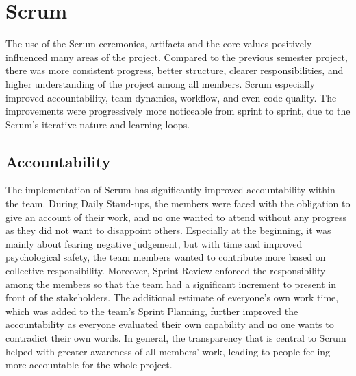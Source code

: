 \section{Scrum}

The use of the Scrum ceremonies, artifacts and the core values positively influenced many areas of the project. Compared to the previous semester project, there was more consistent progress, better structure, clearer responsibilities, and higher understanding of the project among all members. Scrum especially improved accountability, team dynamics, workflow, and even code quality. The improvements were progressively more noticeable from sprint to sprint, due to the Scrum's iterative nature and learning loops.

\subsection*{Accountability}
The implementation of Scrum has significantly improved accountability within the team. During Daily Stand-ups, the members were faced with the obligation to give an account of their work, and no one wanted to attend without any progress as they did not want to disappoint others. Especially at the beginning, it was mainly about fearing negative judgement, but with time and improved psychological safety, the team members wanted to contribute more based on collective responsibility. Moreover, Sprint Review enforced the responsibility among the members so that the team had a significant increment to present in front of the stakeholders. The additional estimate of everyone's own work time, which was added to the team's Sprint Planning, further improved the accountability as everyone evaluated their own capability and no one wants to contradict their own words. In general, the transparency that is central to Scrum helped with greater awareness of all members' work, leading to people feeling more accountable for the whole project.

